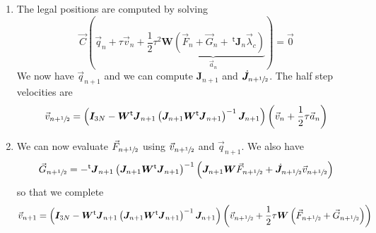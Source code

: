 \documentclass[aps,onecolumn]{revtex4}
\newcommand{\mymat}[1]{\boldsymbol{#1}}
\newcommand{\mytrn}[1]{{\!\!~^{\mathsf{t}}{#1}}}
\newcommand{\half}{\sfrac{1}{2}}
\begin{document}
\begin{enumerate}
\item	
The legal positions are computed by solving
	\begin{equation}
		\vec{C}\left(\vec{q}_n + \tau \vec{v}_n + \dfrac{1}{2}\tau^2\underbrace{\mymat{W}(\vec{F}_n+\vec{G}_n+\mytrn{\mymat{J}}_n \vec{\lambda}_c)}_{\vec{a}_n}\right) = \vec{0}
	\end{equation}
We now have $\vec{q}_{n+1}$ and we can compute $\mymat{J}_{n+1}$ and $\dot{\mymat{J}}_{n+\half}$.
The half step velocities are
\begin{equation}
	\vec{v}_{n+\half} = 
	\left(\mymat{I}_{3N} - \mymat{W}\mytrn{\mymat{J}}_{n+1} \left(\mymat{J}_{n+1}\mymat{W} \mytrn{\mymat{J}}_{n+1}\right)^{-1}\mymat{J}_{n+1} \right) \left( \vec{v}_{n} + \frac{1}{2} \tau \vec{a}_n \right)
\end{equation}

\item We can now evaluate $\vec{F}_{n+\half}$  using $\vec{v}_{n+\half}$ and $\vec{q}_{n+1}$.
We also have
\begin{equation}
\vec{G}_{n+\half} = - \mytrn{\mymat{J}}_{n+1} \left(\mymat{J}_{n+1}\mymat{W} \mytrn{\mymat{J}}_{n+1}\right)^{-1}\left(\mymat{J}_{n+1}\mymat{W}\vec{F}_{n+\half} + \dot{\mymat{J}}_{n+\half}\vec{v}_{n+\half}\right)
\end{equation}
so that we complete
\begin{equation}
	\vec{v}_{n+1} = \left(\mymat{I}_{3N} - \mymat{W}\mytrn{\mymat{J}}_{n+1} \left(\mymat{J}_{n+1}\mymat{W} \mytrn{\mymat{J}}_{n+1}\right)^{-1}\mymat{J}_{n+1} \right) \left( \vec{v}_{n+\half} + \frac{1}{2}\tau \mymat{W} \left(\vec{F}_{n+\half}+\vec{G}_{n+\half}\right)\right)
\end{equation}

\end{enumerate}
\end{document}
